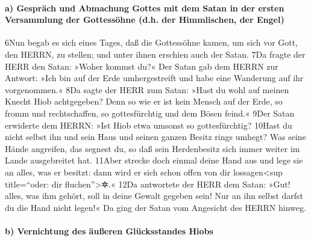\hypertarget{a-gespruxe4ch-und-abmachung-gottes-mit-dem-satan-in-der-ersten-versammlung-der-gottessuxf6hne-d.h.-der-himmlischen-der-engel}{%
\paragraph{a) Gespräch und Abmachung Gottes mit dem Satan in der ersten
Versammlung der Gottessöhne (d.h. der Himmlischen, der
Engel)}\label{a-gespruxe4ch-und-abmachung-gottes-mit-dem-satan-in-der-ersten-versammlung-der-gottessuxf6hne-d.h.-der-himmlischen-der-engel}}

6Nun begab es sich eines Tages, daß die Gottessöhne kamen, um sich vor
Gott, den HERRN, zu stellen; und unter ihnen erschien auch der Satan.
7Da fragte der HERR den Satan: »Woher kommst du?« Der Satan gab dem
HERRN zur Antwort: »Ich bin auf der Erde umhergestreift und habe eine
Wanderung auf ihr vorgenommen.« 8Da sagte der HERR zum Satan: »Hast du
wohl auf meinen Knecht Hiob achtgegeben? Denn so wie er ist kein Mensch
auf der Erde, so fromm und rechtschaffen, so gottesfürchtig und dem
Bösen feind.« 9Der Satan erwiderte dem HERRN: »Ist Hiob etwa umsonst so
gottesfürchtig? 10Hast du nicht selbst ihn und sein Haus und seinen
ganzen Besitz rings umhegt? Was seine Hände angreifen, das segnest du,
so daß sein Herdenbesitz sich immer weiter im Lande ausgebreitet hat.
11Aber strecke doch einmal deine Hand aus und lege sie an alles, was er
besitzt: dann wird er sich schon offen von dir lossagen\textless sup
title=``oder: dir fluchen''\textgreater✲.« 12Da antwortete der HERR dem
Satan: »Gut! alles, was ihm gehört, soll in deine Gewalt gegeben sein!
Nur an ihn selbst darfst du die Hand nicht legen!« Da ging der Satan vom
Angesicht des HERRN hinweg.

\hypertarget{b-vernichtung-des-uxe4uuxdferen-gluxfccksstandes-hiobs}{%
\paragraph{b) Vernichtung des äußeren Glücksstandes
Hiobs}\label{b-vernichtung-des-uxe4uuxdferen-gluxfccksstandes-hiobs}}

